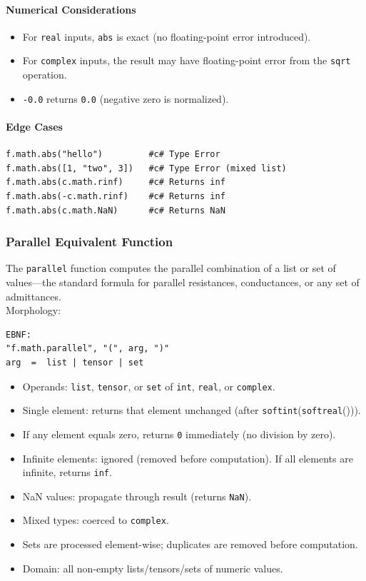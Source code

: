 \paragraph{Numerical Considerations}
\begin{itemize}
\item For \texttt{real} inputs, \texttt{abs} is exact (no floating-point error introduced).
\item For \texttt{complex} inputs, the result may have floating-point error from the \texttt{sqrt} operation.
\item \texttt{-0.0} returns \texttt{0.0} (negative zero is normalized).
\end{itemize}

\paragraph{Edge Cases}
\begin{verbatim}
f.math.abs("hello")         #c# Type Error
f.math.abs([1, "two", 3])   #c# Type Error (mixed list)
f.math.abs(c.math.rinf)     #c# Returns inf
f.math.abs(-c.math.rinf)    #c# Returns inf
f.math.abs(c.math.NaN)      #c# Returns NaN
\end{verbatim}

\subsubsection{Parallel Equivalent Function}
The \texttt{parallel} function computes the parallel combination of a list or set of values---the standard formula for parallel resistances, conductances, or any set of admittances.\\
Morphology:
\begin{verbatim}
EBNF:
"f.math.parallel", "(", arg, ")"
arg  =  list | tensor | set
\end{verbatim}
\begin{itemize}
\item Operands: \texttt{list}, \texttt{tensor}, or \texttt{set} of \texttt{int}, \texttt{real}, or \texttt{complex}.
\item Single element: returns that element unchanged (after \texttt{softint}(\texttt{softreal}())).
\item If any element equals zero, returns \texttt{0} immediately (no division by zero).
\item Infinite elements: ignored (removed before computation). If all elements are infinite, returns \texttt{inf}.
\item NaN values: propagate through result (returns \texttt{NaN}).
\item Mixed types: coerced to \texttt{complex}.
\item Sets are processed element-wise; duplicates are removed before computation.
\item Domain: all non-empty lists/tensors/sets of numeric values.
\end{itemize}


